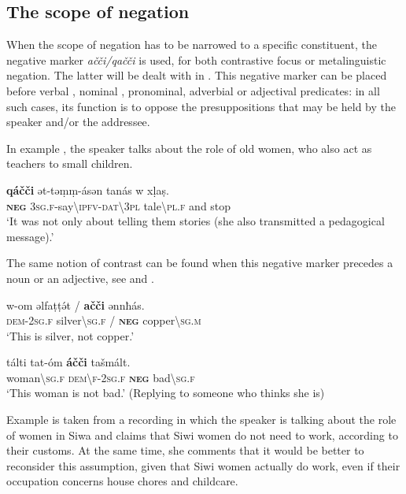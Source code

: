 \documentclass[output=paper,colorlinks,citecolor=brown]{langscibook}
\begin{document}
\subsection{The scope of negation}\label{sec:siw:4.1}

When the scope of negation has to be narrowed to a specific constituent, the negative marker \textit{ačči/qačči} is used, for both contrastive focus or metalinguistic negation. The latter will be dealt with in . This negative marker can be placed before verbal , nominal , pronominal, adverbial or adjectival  predicates: in all such cases, its function is to oppose the presuppositions that may be held by the speaker and/or the addressee.

In example , the speaker talks about the role of old women, who also act as teachers to small children.

\ea\label{ex:siw:62}
    \gll \textbf{qáčči} ət-təṃṃ-ásən tan{\fdot}ás w xḷaṣ.\\
         \textbf{\textsc{neg}} \textsc{3sg.f}{}-say{\textbackslash}\textsc{ipfv-dat\textbackslash3pl} tale{\textbackslash}\textsc{pl.f} and stop\\
    \glt ‘It was not only about telling them stories (she also transmitted a pedagogical message).’
\z

The same notion of contrast can be found when this negative marker precedes a noun or an adjective, see  and .

\ea\label{ex:siw:63}
    \gll w-om əlfaṭṭ\'{ə}t / \textbf{ačči} ənnħás. \\
         \textsc{dem-2sg.f} silver{\textbackslash}\textsc{sg.f} / \textsc{\textbf{neg}} copper{\textbackslash}\textsc{sg.m} \\
    \glt ‘This is silver, not copper.’
\z

\ea\label{ex:siw:64}
    \gll tálti tat-óm \textbf{áčči} tašmált. \\
         woman{\textbackslash}\textsc{sg.f} \textsc{dem{\textbackslash}f-2sg.f} \textbf{\textsc{neg}} bad{\textbackslash}\textsc{sg.f}\\
    \glt ‘This woman is not bad.’ (Replying to someone who thinks she is)
\z

Example  is taken from a recording in which the speaker is talking about the role of women in Siwa and claims that Siwi women do not need to work, according to their customs. At the same time, she comments that it would be better to reconsider this assumption, given that Siwi women actually do work, even if their occupation concerns house chores and childcare.
\end{document}
